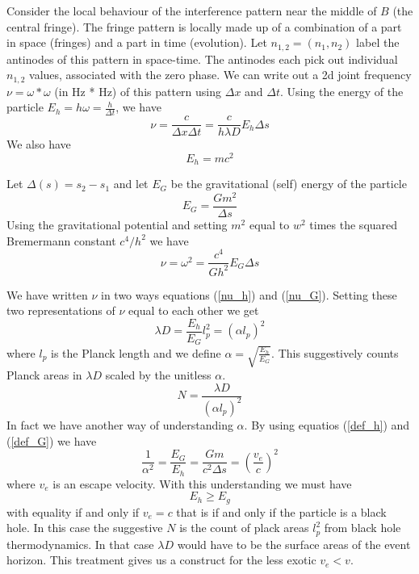\documentclass[12pt,a4paper]{article}
\begin{document}
Consider the local behaviour of the interference pattern near the middle of $B$ (the central fringe). The fringe pattern is locally made up of a combination of a part in space (fringes) and a part in time (evolution). Let $n_{1,2} = (n_1, n_2)$ label the antinodes of this pattern in space-time. The antinodes each pick out individual $n_{1,2}$ values, associated with the zero phase. We can write out a 2d joint frequency $\nu = \omega * \omega$ (in Hz * Hz) of this pattern using $\Delta x$ and $\Delta t$.  Using the energy of the particle $E_h = h \omega = \frac{h}{\Delta t}$, we have
\begin{equation}
\label{nu_h}
  \nu = \frac{c}{\Delta x \Delta t} = \frac{c}{h \lambda D} E_h \Delta{s}
\end{equation}
We also have
\begin{equation}
\label{def_h}
E_h = m c^2
\end{equation}


Let $\Delta(s) = s_2 - s_1$ and let $E_G$ be the gravitational (self) energy of the particle
\begin{equation}
\label{def_G}
E_G = \frac{G m^2}{\Delta s}
\end{equation}
Using the gravitational potential and setting $m^2$  equal to $w^2$ times the squared Bremermann constant $c^4/h^2$ we have
\begin{equation}
\label{nu_G}
\nu = \omega^2 = \frac{c^4}{G h^2} E_G \Delta s
\end{equation}


We have written $\nu$ in two ways equations (\ref{nu_h}) and (\ref{nu_G}). Setting these two representations of $\nu$ equal to each other we get
\[
\lambda D = \frac{E_h}{E_G} l_p^2 = (\alpha l_p)^2
\]
where $l_p$ is the Planck length and we define $\alpha = \sqrt{\frac{E_h}{E_G}}$. This suggestively counts Planck areas in $\lambda D$ scaled by the unitless $\alpha$.
\[
   N = \frac{\lambda D}{(\alpha l_p)^2}
\]
In fact we have another way of understanding $\alpha$.  By using equatios (\ref{def_h}) and (\ref{def_G}) we have
\[
  \frac{1}{\alpha^2} = \frac{E_G}{E_h} = \frac{Gm}{c^2\Delta s} = \left(\frac{v_e}{c}\right)^2
\]
where $v_e$ is an escape velocity.  With this understanding we must have
\[
   E_h \ge E_g
\]
with equality if and only if $v_e = c$ that is if and only if the particle is a black hole.  In this case the suggestive $N$ is the count of plack areas $l_p^2$ from black hole thermodynamics.  In that case $\lambda D$ would have to be the surface areas of the event horizon.  This treatment gives us a construct for the less exotic $v_e < v$.
\end{document}
